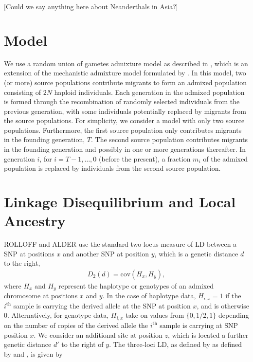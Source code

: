 [Could we say anything here about Neanderthals in Asia?]

\section{Model}
We use a random union of gametes admixture model as described in \cite{liang2014understanding}, which is an extension of the mechanistic admixture model formulated by \cite{verdu2011general}. In this model, two (or more) source populations contribute migrants to form an admixed population consisting of $2N$ haploid individuals. Each generation in the admixed population is formed through the recombination of randomly selected individuals from the previous generation, with some individuals potentially replaced by migrants from the source populations. For simplicity, we consider a model with only two source populations. Furthermore, the first source population only contributes migrants in the founding generation, $T$. The second source population contributes migrants in the founding generation and possibly in one or more generations thereafter. In generation $i$, for $i=T-1,\dots,0$ (before the present), a fraction $m_i$ of the admixed population is replaced by individuals from the second source population.
 
\section{Linkage Disequilibrium and Local Ancestry}
ROLLOFF and ALDER use the standard two-locus measure of LD between a SNP at positions $x$ and another SNP at position $y$, which is a genetic distance $d$ to the right, 
\begin{align}
D_2(d) = \text{cov}(H_x,H_y),
\label{D2}
\end{align}
where $H_x$ and $H_y$ represent the haplotype or genotypes of an admixed chromosome at positions $x$ and $y$. In the case of haplotype data, $H_{i,x}=1$ if the $i^\text{th}$ sample is carrying the derived allele at the SNP at position $x$, and is otherwise 0. Alternatively, for genotype data, $H_{i,x}$ take on values from $\{0,1/2,1\}$ depending on the number of copies of the derived allele the $i^\text{th}$ sample is carrying at SNP position $x$. 
We consider an additional site at position $z$, which is located a further genetic distance $d'$ to the right of $y$. The three-loci LD, as defined by as defined by \cite{bennett1952theory} and \cite{slatkin1972treating}, is given by

